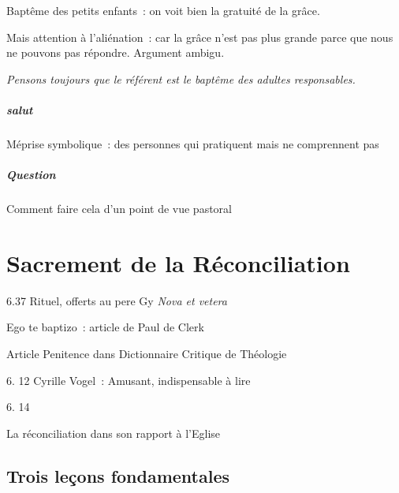 Baptême des petits enfants~: on voit bien la gratuité de la grâce.

Mais attention à l'aliénation~: car la grâce n'est pas plus grande parce
que nous ne pouvons pas répondre. Argument ambigu.

\emph{Pensons toujours que le référent est le baptême des adultes
responsables.}

\hypertarget{salut}{%
\paragraph{salut}\label{salut}}

Méprise symbolique~: des personnes qui pratiquent mais ne comprennent
pas

\hypertarget{question}{%
\paragraph{Question}\label{question}}

Comment faire cela d'un point de vue pastoral



\chapter{Sacrement de la Réconciliation}


6.37 Rituel, offerts au pere Gy \emph{Nova et vetera}

Ego te baptizo~: article de Paul de Clerk

Article Penitence dans Dictionnaire Critique de Théologie

6. 12 Cyrille Vogel~: Amusant, indispensable à lire

6. 14

La réconciliation dans son rapport à l'Eglise

\hypertarget{trois-leuxe7ons-fondamentales}{%
\section{Trois leçons
fondamentales}\label{trois-leuxe7ons-fondamentales}}

